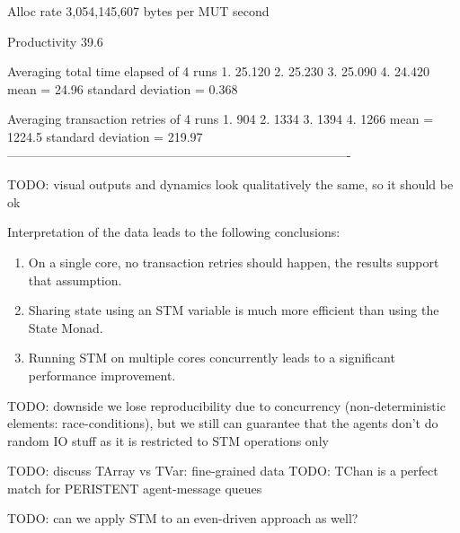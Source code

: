   Alloc rate    3,054,145,607 bytes per MUT second

  Productivity  39.6%

  
Averaging total time elapsed of 4 runs 
1. 25.120
2. 25.230
3. 25.090
4. 24.420
mean = 24.96
standard deviation = 0.368

Averaging transaction retries of 4 runs
1. 904
2. 1334
3. 1394
4. 1266
mean = 1224.5
standard deviation = 219.97
----------------------------------------------------------------------------------

TODO: visual outputs and dynamics look qualitatively the same, so it should be ok

Interpretation of the data leads to the following conclusions:
\begin{enumerate}
	\item On a single core, no transaction retries should happen, the results support that assumption.
	\item Sharing state using an STM variable is much more efficient than using the State Monad.
	\item Running STM on multiple cores concurrently leads to a significant performance improvement.
\end{enumerate}

TODO: downside we lose reproducibility due to concurrency (non-deterministic elements: race-conditions), but we still can guarantee that the agents don't do random IO stuff as it is restricted to STM operations only

TODO: discuss TArray vs TVar: fine-grained data
TODO: TChan is a perfect match for PERISTENT agent-message queues

TODO: can we apply STM to an even-driven approach as well?
